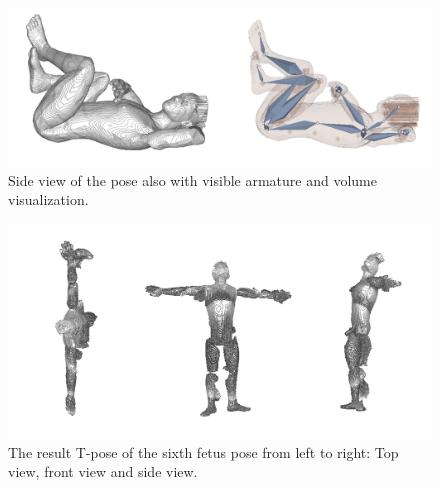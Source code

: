 \begin{figure} [htb!]
    \centering
	\includegraphics[width=15cm]{content/images/results/man6Side.png}
	\caption{Side view of the pose also with visible armature and volume visualization.}
	\label{fig:}
\end{figure}
\vspace{3cm}
\begin{figure} [htb!]
    \centering
	\includegraphics[width=16cm]{content/images/results/man6Result.png}
	\caption{The result T-pose of the sixth fetus pose from left to right: Top view, front view and side view.}
	\label{fig:}
\end{figure}

